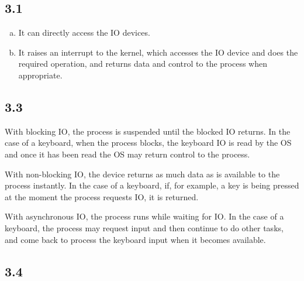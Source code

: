 \documentclass[12pt]{article}
\begin{document}
\subsection*{3.1}
\begin{enumerate}[(a)]
    \item It can directly access the IO devices.
    \item It raises an interrupt to the kernel, which accesses the IO device and does the required operation, and returns data and control to the process when appropriate.
\end{enumerate}

\subsection*{3.3}
With blocking IO, the process is suspended until the blocked IO returns. In the case of a keyboard, when the process blocks, the keyboard IO is read by the OS and once it has been read the OS may return control to the process.

With non-blocking IO, the device returns as much data as is available to the process instantly. In the case of a keyboard, if, for example, a key is being pressed at the moment the process requests IO, it is returned.

With asynchronous IO, the process runs while waiting for IO. In the case of a keyboard, the process may request input and then continue to do other tasks, and come back to process the keyboard input when it becomes available.

\subsection*{3.4}
\end{document}
